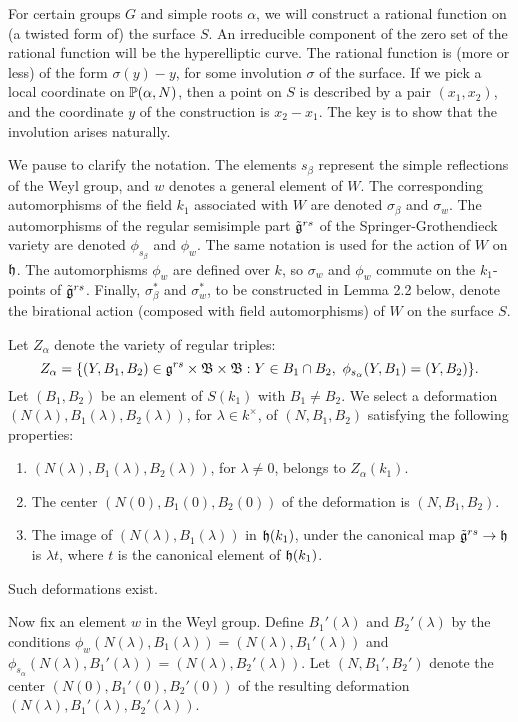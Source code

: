 \documentclass{amsart}
\begin{document}
For certain groups $G$ and simple roots $\alpha$,  we will
construct a rational function on (a twisted
form of) the surface $S$.
An irreducible component of the zero set of the rational
function
will be the hyperelliptic
curve.  
The rational function
is (more or less) of the form $\sigma(y)-y$, for
some involution $\sigma$ of the surface.
If we pick a local coordinate on ${\Bbb P}(\alpha,N)$, 
then a point on $S$
is described by a pair $(x_1,x_2)$, and the coordinate
$y$ of the construction is $x_2-x_1$.
The key is to show
that the involution arises naturally.

We pause to clarify the notation.  The elements
$s_\beta$ represent the simple reflections of the Weyl group, and $w$
denotes a general element of $W$.  The corresponding
automorphisms of the field $k_1$
associated with $W$ are denoted $\sigma_\beta$ and $\sigma_w$.  The
automorphisms of the regular semisimple part $\tilde {{\frak g}}^{rs}$
of the Springer-Grothendieck
variety are denoted $\phi_{s_\beta}$ and $\phi_w$.  The same notation
is used for the action of $W$ on ${\frak h}$.
The automorphisms $\phi_w$ are defined over
$k$, so $\sigma_w$ and $\phi_w$ commute on the $k_1$-points of 
$\tilde {{\frak g}}^{rs}$.
 Finally, $\sigma^*_\beta$ and $\sigma^*_w$,
to be constructed in Lemma 2.2 below,
denote the birational action (composed with field automorphisms) of
$W$ on the surface $S$.  


Let $Z_\alpha$ denote the variety of regular triples:
$$Z_\alpha = \{(Y,B_1,B_2)\in {\frak g}^{rs}\times {\frak B}\times{\frak B} :
   Y\in B_1\cap B_2,\ \phi_{s_\alpha}(Y,B_1) = (Y,B_2)\}.
$$
Let $(B_1,B_2)$ be an element of $S(k_1)$ with $B_1\ne B_2$.
We select a 
deformation $(N(\lambda),B_1(\lambda),B_2(\lambda))$, 
for $\lambda\in k^\times$, of $(N,B_1,B_2)$ satisfying
the following properties:
\begin{enumerate}[label=(\arabic*)]
\item $(N(\lambda),B_1(\lambda),B_2(\lambda))$, for $\lambda\ne0$,
belongs to $Z_\alpha(k_1)$.
\item The center $(N(0),B_1(0),B_2(0))$ of the deformation is $(N,B_1,B_2)$.
\item The image of $(N(\lambda),B_1(\lambda))$ in ${\frak h}(k_1)$, under the
canonical map $\tilde {{\frak g}}^{rs}\to{\frak h}$ is $\lambda t$, where $t$ is the
canonical element of ${\frak h}(k_1)$.
\end{enumerate}
\par
\noindent
Such deformations exist.

Now fix an element $w$ in the Weyl group.  Define $B_1'(\lambda)$ and
$B_2'(\lambda)$ by the conditions $\phi_w(N(\lambda),B_1(\lambda)) =
(N(\lambda),B_1'(\lambda))$ and $\phi_{s_\alpha}(N(\lambda),B_1'(\lambda))=
(N(\lambda),B_2'(\lambda))$. Let $(N,B_1',B_2')$ denote the center
$(N(0),B_1'(0),B_2'(0))$ of the resulting deformation 
$(N(\lambda),B_1'(\lambda),B_2'(\lambda))$.
\end{document}
